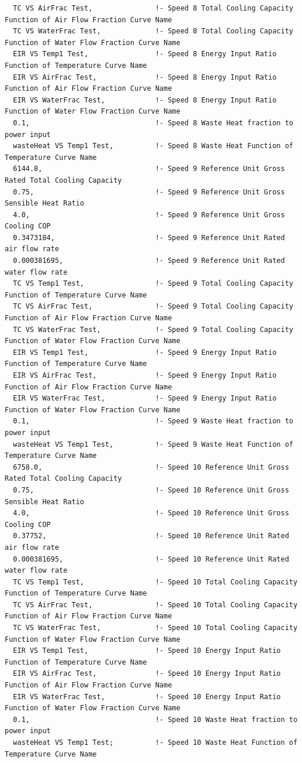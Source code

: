 \begin{lstlisting}
  TC VS AirFrac Test,               !- Speed 8 Total Cooling Capacity Function of Air Flow Fraction Curve Name
  TC VS WaterFrac Test,             !- Speed 8 Total Cooling Capacity Function of Water Flow Fraction Curve Name
  EIR VS Temp1 Test,                !- Speed 8 Energy Input Ratio Function of Temperature Curve Name
  EIR VS AirFrac Test,              !- Speed 8 Energy Input Ratio Function of Air Flow Fraction Curve Name
  EIR VS WaterFrac Test,            !- Speed 8 Energy Input Ratio Function of Water Flow Fraction Curve Name
  0.1,                              !- Speed 8 Waste Heat fraction to power input
  wasteHeat VS Temp1 Test,          !- Speed 8 Waste Heat Function of Temperature Curve Name
  6144.8,                           !- Speed 9 Reference Unit Gross Rated Total Cooling Capacity
  0.75,                             !- Speed 9 Reference Unit Gross Sensible Heat Ratio
  4.0,                              !- Speed 9 Reference Unit Gross Cooling COP
  0.3473184,                        !- Speed 9 Reference Unit Rated air flow rate
  0.000381695,                      !- Speed 9 Reference Unit Rated water flow rate
  TC VS Temp1 Test,                 !- Speed 9 Total Cooling Capacity Function of Temperature Curve Name
  TC VS AirFrac Test,               !- Speed 9 Total Cooling Capacity Function of Air Flow Fraction Curve Name
  TC VS WaterFrac Test,             !- Speed 9 Total Cooling Capacity Function of Water Flow Fraction Curve Name
  EIR VS Temp1 Test,                !- Speed 9 Energy Input Ratio Function of Temperature Curve Name
  EIR VS AirFrac Test,              !- Speed 9 Energy Input Ratio Function of Air Flow Fraction Curve Name
  EIR VS WaterFrac Test,            !- Speed 9 Energy Input Ratio Function of Water Flow Fraction Curve Name
  0.1,                              !- Speed 9 Waste Heat fraction to power input
  wasteHeat VS Temp1 Test,          !- Speed 9 Waste Heat Function of Temperature Curve Name
  6758.0,                           !- Speed 10 Reference Unit Gross Rated Total Cooling Capacity
  0.75,                             !- Speed 10 Reference Unit Gross Sensible Heat Ratio
  4.0,                              !- Speed 10 Reference Unit Gross Cooling COP
  0.37752,                          !- Speed 10 Reference Unit Rated air flow rate
  0.000381695,                      !- Speed 10 Reference Unit Rated water flow rate
  TC VS Temp1 Test,                 !- Speed 10 Total Cooling Capacity Function of Temperature Curve Name
  TC VS AirFrac Test,               !- Speed 10 Total Cooling Capacity Function of Air Flow Fraction Curve Name
  TC VS WaterFrac Test,             !- Speed 10 Total Cooling Capacity Function of Water Flow Fraction Curve Name
  EIR VS Temp1 Test,                !- Speed 10 Energy Input Ratio Function of Temperature Curve Name
  EIR VS AirFrac Test,              !- Speed 10 Energy Input Ratio Function of Air Flow Fraction Curve Name
  EIR VS WaterFrac Test,            !- Speed 10 Energy Input Ratio Function of Water Flow Fraction Curve Name
  0.1,                              !- Speed 10 Waste Heat fraction to power input
  wasteHeat VS Temp1 Test;          !- Speed 10 Waste Heat Function of Temperature Curve Name
\end{lstlisting}

